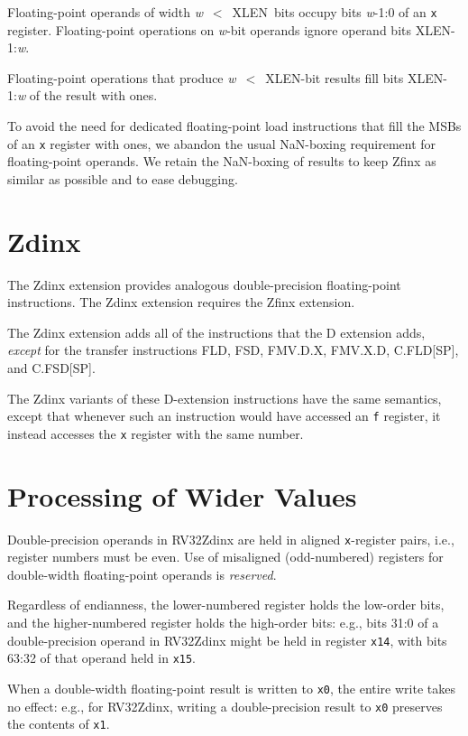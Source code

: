 Floating-point operands of width \mbox{{\em w} $<$ XLEN bits} occupy bits
\mbox{{\em w}-1:0} of an {\tt x} register.
Floating-point operations on {\em w}-bit operands ignore operand bits
\mbox{XLEN-1:{\em w}}.

Floating-point operations that produce \mbox{{\em w} $<$ XLEN-bit} results
fill bits \mbox{XLEN-1:{\em w}} of the result with ones.

\begin{commentary}
To avoid the need for dedicated floating-point load instructions that fill the
MSBs of an {\tt x} register with ones, we abandon the usual NaN-boxing
requirement for floating-point operands.
We retain the NaN-boxing of results to keep Zfinx as similar as possible and
to ease debugging.
\end{commentary}

\section{Zdinx}

The Zdinx extension provides analogous double-precision floating-point
instructions.
The Zdinx extension requires the Zfinx extension.

The Zdinx extension adds all of the instructions that the D extension
adds, {\em except} for the transfer instructions FLD, FSD, FMV.D.X,
FMV.X.D, C.FLD[SP], and C.FSD[SP].

The Zdinx variants of these D-extension instructions have the same semantics,
except that whenever such an instruction would have accessed an {\tt f}
register, it instead accesses the {\tt x} register with the same number.

\section{Processing of Wider Values}

Double-precision operands in RV32Zdinx
are held in aligned {\tt x}-register pairs, i.e.,
register numbers must be even.
Use of misaligned (odd-numbered) registers for double-width floating-point
operands is {\em reserved}.

Regardless of endianness, the lower-numbered register holds the low-order
bits, and the higher-numbered register holds the high-order bits: e.g., bits
31:0 of a double-precision operand in RV32Zdinx might be held in register
{\tt x14}, with bits 63:32 of that operand held in {\tt x15}.

When a double-width floating-point result is written to {\tt x0}, the entire
write takes no effect: e.g., for RV32Zdinx, writing a double-precision result
to {\tt x0} preserves the contents of {\tt x1}.

